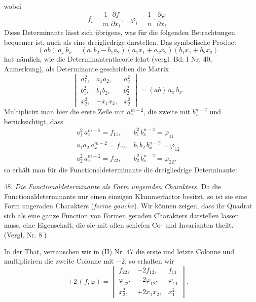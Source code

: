 wobei
\[
f_i = \frac{1}{m}\,\frac{\partial f}{\partial x_i}, \quad \varphi_i = \frac{1}{n}\cdot\frac{\partial \varphi}{\partial x_i}.
\]
Diese Determinante lässt sich übrigens, was für die folgenden Betrachtungen bequemer ist, auch als eine dreigliedrige darstellen. Das symbolische Product
\[
(ab)\,a_x\,b_x = (a_1b_2 - b_1a_2)(a_1x_1 + a_2x_2)(b_1x_1 + b_2x_2)
\]
hat nämlich, wie die Determinantentheorie lehrt (vergl. Bd. I Nr. 40, Anmerkung), als Determinante geschrieben die Matrix
\[
\begin{vmatrix} a_1^2, & a_1a_2, & a_2^2 \\ b_1^2, & b_1b_2, & b_2^2 \\ x_2^2, & -x_1x_2, & x_2^2 \end{vmatrix} = (ab)\,a_x\,b_x.
\]
Multiplicirt man hier die erste Zeile mit $a_x^{m-2}$, die zweite mit $b_x^{n-2}$ und berücksichtigt, dass
\[
\begin{array}{ll}
a_1^2\,a_x^{m-2} = f_{11}, & b_1^2\,b_x^{n-2} = \varphi_{11} \\
a_1a_2\,a_x^{m-2} = f_{12}, & b_1b_2\,b_x^{n-2} = \varphi_{12} \\
a_2^2\,a_x^{m-2} = f_{22}, & b_2^2\,b_x^{n-2} = \varphi_{22},
\end{array}
\]
so erhält man für die Functionaldeterminante die dreigliedrige Determinante:

48. \textit{Die Functionaldeterminante als Form ungeraden Charakters.} Da die Functionaldeterminante nur einen einzigen Klammerfactor besitzt, so ist sie eine Form ungeraden Charakters (\textit{forme gauche}). Wir können zeigen, dass ihr Quadrat sich als eine ganze Function von Formen geraden Charakters darstellen lassen muss, eine Eigenschaft, die sie mit allen schiefen Co- und Invarianten theilt. (Vergl. Nr. 8.)

In der That, vertauschen wir in (II) Nr. 47 die erste und letzte Colonne und multipliciren die zweite Colonne mit $-2$, so erhalten wir
\[
+2\,(f, \varphi) = \begin{vmatrix} f_{22}, & -2f_{12}, & f_{11} \\ \varphi_{22}, & -2\varphi_{12}, & \varphi_{11} \\ x_2^2, & +2x_1x_2, & x_1^2 \end{vmatrix}.
\]


